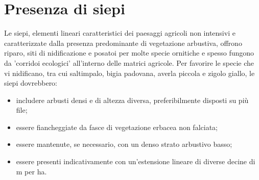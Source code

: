 \documentclass[10pt,twoside,openany,x11names,svgnames,italian,a5paper,dvipsnames,table]{memoir}
\begin{document}
\section{Presenza di siepi}
Le siepi, elementi lineari caratteristici dei paesaggi agricoli non intensivi e caratterizzate dalla presenza predominante di vegetazione arbustiva, offrono riparo, siti di nidificazione e posatoi per molte specie ornitiche e spesso fungono da 'corridoi ecologici' all’interno delle matrici agricole. Per favorire le specie che vi nidificano, tra cui saltimpalo, bigia padovana, averla piccola e zigolo giallo, le siepi dovrebbero:
\begin{itemize}\itemsep0pt
  \item includere arbusti densi e di altezza diversa, preferibilmente disposti su più file;
  \item essere fiancheggiate da fasce di vegetazione erbacea non falciata;
  \item essere mantenute, se necessario, con un denso strato arbustivo basso;
  \item essere presenti indicativamente con un'estensione lineare di diverse decine di m per ha.
\end{itemize}
\end{document}
